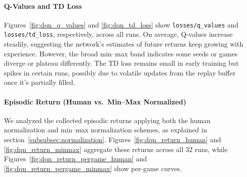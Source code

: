 %

\paragraph{Q-Values and TD Loss}
Figures~\ref{fig:dqn_q_values} and \ref{fig:dqn_td_loss} show \texttt{losses/q\_values} and 
\texttt{losses/td\_loss}, respectively, across all runs.
On average, Q-values increase steadily, suggesting the network’s estimates 
of future returns keep growing with experience. However, 
the broad min--max band indicates some seeds or games diverge or plateau differently. 
The TD loss remains small in early training but spikes in certain runs, 
possibly due to volatile updates from the replay buffer once it’s partially filled.

\paragraph{Episodic Return (Human vs.\ Min--Max Normalized)}
We analyzed the collected episodic returns applying both the human normalization and min--max normalization schemes, as explained in section~\vref{subsubsec:normalization}.
Figures~\ref{fig:dqn_return_human} and \ref{fig:dqn_return_minmax} aggregate 
these returns across all 32 runs, while 
Figures~\ref{fig:dqn_return_pergame_human} and \ref{fig:dqn_return_pergame_minmax} 
show per-game curves.

